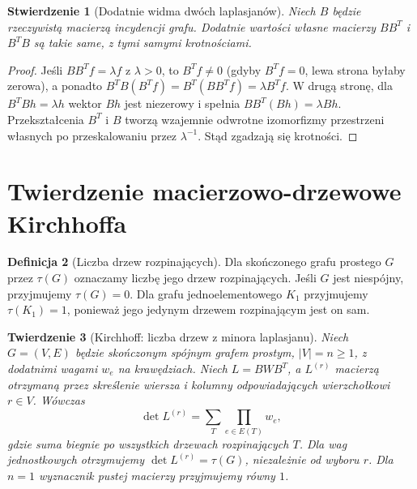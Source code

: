 \documentclass[11pt,a4paper]{report}
\numberwithin{equation}{section}
\theoremstyle{plain}
\newtheorem{twierdzenie}{Twierdzenie}[section]
\newtheorem{stwierdzenie}[twierdzenie]{Stwierdzenie}
\theoremstyle{definition}
\newtheorem{definicja}[twierdzenie]{Definicja}
\theoremstyle{remark}
\begin{document}
\begin{stwierdzenie}[Dodatnie widma dwóch laplasjanów]
Niech $B$ będzie rzeczywistą macierzą incydencji grafu.
Dodatnie wartości własne macierzy $BB^T$ i $B^TB$
są takie same, z tymi samymi krotnościami.
\end{stwierdzenie}

\begin{proof}
Jeśli $BB^Tf=\lambda f$ z $\lambda>0$, to
$B^Tf\ne0$ (gdyby $B^Tf=0$, lewa strona byłaby zerowa),
a ponadto
$B^TB(B^Tf)=B^T(BB^Tf)=\lambda B^Tf$.
W drugą stronę, dla $B^TBh=\lambda h$ wektor
$Bh$ jest niezerowy i spełnia
$BB^T(Bh)=\lambda Bh$.
Przekształcenia $B^T$ i $B$ tworzą wzajemnie odwrotne
izomorfizmy przestrzeni własnych po przeskalowaniu
przez $\lambda^{-1}$. Stąd zgadzają się krotności.
\end{proof}

\section{Twierdzenie macierzowo-drzewowe Kirchhoffa}
\label{sec:tg-matrix-tree}

\begin{definicja}[Liczba drzew rozpinających]
Dla skończonego grafu prostego $G$ przez $\tau(G)$
oznaczamy liczbę jego drzew rozpinających.
Jeśli $G$ jest niespójny, przyjmujemy $\tau(G)=0$.
Dla grafu jednoelementowego $K_1$ przyjmujemy
$\tau(K_1)=1$, ponieważ jego jedynym drzewem
rozpinającym jest on sam.
\end{definicja}

\begin{twierdzenie}[Kirchhoff: liczba drzew z minora laplasjanu]
\label{thm:tg-kirchhoff}
Niech $G=(V,E)$ będzie skończonym spójnym grafem prostym,
$|V|=n\ge1$, z dodatnimi wagami $w_e$ na krawędziach.
Niech $L=BWB^T$, a $L^{(r)}$ macierzą otrzymaną
przez skreślenie wiersza i kolumny odpowiadających
wierzchołkowi $r\in V$. Wówczas
\[
\det L^{(r)}=\sum_{T}\prod_{e\in E(T)}w_e,
\]
gdzie suma biegnie po wszystkich drzewach rozpinających $T$.
Dla wag jednostkowych otrzymujemy
$\det L^{(r)}=\tau(G)$, niezależnie od wyboru $r$.
Dla $n=1$ wyznacznik pustej macierzy przyjmujemy równy $1$.
\end{twierdzenie}
\end{document}
